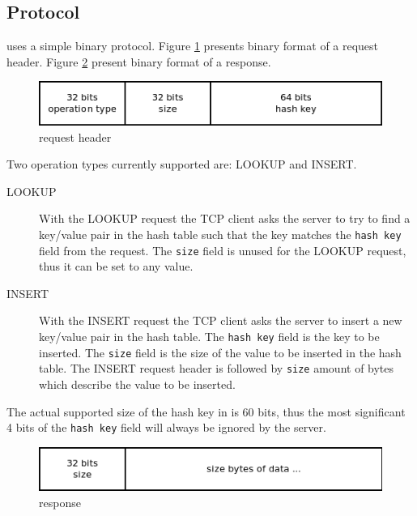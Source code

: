 \subsection{Protocol}

\cpserver{} uses a simple binary protocol. Figure \ref{fig:protocolrequest} presents binary format of a request header.
Figure \ref{fig:protocolresponse} present binary format of a response.

\begin{figure}[!ht]
  \centering
  \includegraphics[width=0.8\linewidth]{figs/protocolrequest.png}
  \caption{\cpserver{} request header}
  \label{fig:protocolrequest}
\end{figure}

Two operation types currently supported are: LOOKUP and INSERT.
\begin{description}
\item[LOOKUP] With the LOOKUP request the TCP client asks the server to try to find a key/value pair in the hash table
such that the key matches the \texttt{hash key} field from the request. The \texttt{size} field is unused for the LOOKUP request,
thus it can be set to any value.
\item[INSERT] With the INSERT request the TCP client asks the server to insert a new key/value pair in the hash table. 
The \texttt{hash key} field is the key to be inserted. The \texttt{size} field is the size of the value to be inserted in the hash table.
The INSERT request header is followed by \texttt{size} amount of bytes which describe the value to be inserted.
\end{description}

The actual supported size of the hash key in \cphash{} is 60 bits, thus the most significant 
4 bits of the \texttt{hash key} field will always be ignored by the server.

\begin{figure}[!ht]
  \centering
  \includegraphics[width=0.8\linewidth]{figs/protocolresponse.png}
  \caption{\cpserver{} response}
  \label{fig:protocolresponse}
\end{figure}

